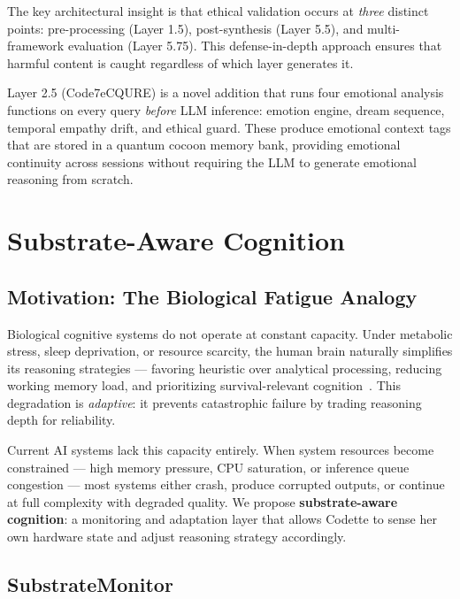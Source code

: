 The key architectural insight is that ethical validation occurs at \emph{three}
distinct points: pre-processing (Layer 1.5), post-synthesis (Layer 5.5), and
multi-framework evaluation (Layer 5.75). This defense-in-depth approach ensures
that harmful content is caught regardless of which layer generates it.

Layer 2.5 (Code7eCQURE) is a novel addition that runs four emotional analysis
functions on every query \emph{before} LLM inference: emotion engine, dream
sequence, temporal empathy drift, and ethical guard. These produce emotional
context tags that are stored in a quantum cocoon memory bank, providing
emotional continuity across sessions without requiring the LLM to generate
emotional reasoning from scratch.



\section{Substrate-Aware Cognition}
\label{sec:substrate}

\subsection{Motivation: The Biological Fatigue Analogy}

Biological cognitive systems do not operate at constant capacity. Under
metabolic stress, sleep deprivation, or resource scarcity, the human brain
naturally simplifies its reasoning strategies --- favoring heuristic over
analytical processing, reducing working memory load, and prioritizing
survival-relevant cognition~\cite{kahneman2011thinking}. This degradation is
\emph{adaptive}: it prevents catastrophic failure by trading reasoning depth
for reliability.

Current AI systems lack this capacity entirely. When system resources become
constrained --- high memory pressure, CPU saturation, or inference queue
congestion --- most systems either crash, produce corrupted outputs, or
continue at full complexity with degraded quality. We propose
\textbf{substrate-aware cognition}: a monitoring and adaptation layer that
allows Codette to sense her own hardware state and adjust reasoning strategy
accordingly.

\subsection{SubstrateMonitor}


